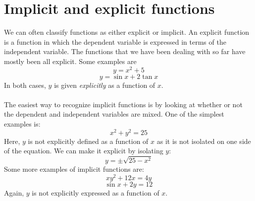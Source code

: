 \documentclass[11pt]{scrartcl}
\begin{document}
\maketitle
\noindent

\section{Implicit and explicit functions}
\noindent
We can often classify functions as either explicit or implicit. An explicit function is a function in which the dependent variable is expressed in terms of the independent variable. The functions that we have been dealing with so far have mostly been all explicit. Some examples are
$$y=x^2+5$$
$$y=\sin x+2\tan x$$
In both cases, $y$ is given \textit{explicitly} as a function of $x$. \\
\noindent\\
The easiest way to recognize implicit functions is by looking at whether or not the dependent and independent variables are mixed. One of the simplest examples is:
$$x^2+y^2=25$$
Here, $y$ is not explicitly defined as a function of $x$ as it is not isolated on one side of the equation. We can make it explicit by isolating $y$:
$$y=\pm\sqrt {25-x^2}$$
Some more examples of implicit functions are:
$$xy^2+12x=4y$$
$$\sin x +2y=12$$
Again, $y$ is not explicitly expressed as a function of $x$. 
\end{document}
